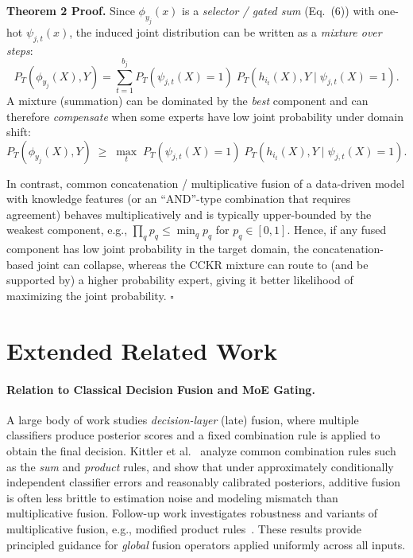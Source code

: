\documentclass{article}
\begin{document}
\noindent\textbf{Theorem 2 Proof.}
Since $\phi_{y_j}(x)$ is a \emph{selector / gated sum} (Eq.~(6)) with one-hot $\psi_{j,t}(x)$, the induced joint
distribution can be written as a \emph{mixture over steps}:
{\scriptsize
\[
P_T(\phi_{y_j}(X),Y)=\sum_{t=1}^{b_j} P_T(\psi_{j,t}(X)=1)\;P_T(h_{i_t}(X),Y\mid \psi_{j,t}(X)=1).
\]
}
A mixture (summation) can be dominated by the \emph{best} component and can therefore \emph{compensate} when some experts
have low joint probability under domain shift:
{\scriptsize
\[
P_T(\phi_{y_j}(X),Y)\;\ge\;\max_t \;P_T(\psi_{j,t}(X)=1)\;P_T(h_{i_t}(X),Y\mid \psi_{j,t}(X)=1).
\]
}

In contrast, common concatenation / multiplicative fusion of a data-driven model with knowledge features (or an ``AND''-type
combination that requires agreement) behaves multiplicatively and is typically upper-bounded by the weakest component,
e.g., $\prod_q p_q \le \min_q p_q$ for $p_q\in[0,1]$. Hence, if any fused component has low joint probability in the target
domain, the concatenation-based joint can collapse, whereas the CCKR mixture can route to (and be supported by) a higher
probability expert, giving it better likelihood of maximizing the joint probability. \hfill$\square$
\section{Extended Related Work}
\label{app:extended-related}

\paragraph{Relation to Classical Decision Fusion and MoE Gating.}
\label{app:kittler_moe} A large body of work studies \emph{decision-layer} (late) fusion, where
multiple classifiers produce posterior scores and a fixed combination rule
is applied to obtain the final decision. Kittler et al.~\cite{kittler1998}
analyze common combination rules such as the \emph{sum} and \emph{product}
rules, and show that under approximately conditionally independent
classifier errors and reasonably calibrated posteriors, additive fusion is
often less brittle to estimation noise and modeling mismatch than
multiplicative fusion. Follow-up work investigates robustness and variants
of multiplicative fusion, e.g., modified product rules~\cite{alkoot2002}.
These results provide principled guidance for \emph{global} fusion
operators applied uniformly across all inputs.
\end{document}
